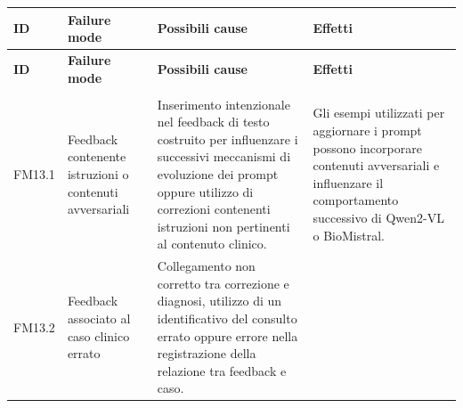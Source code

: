 

{
\small
{}
\setlength{\tabcolsep}{4pt}
\renewcommand{\arraystretch}{1.08}

\begin{xltabular}{\textwidth}{
    >{\raggedright\arraybackslash}p{1.1cm}
    >{\raggedright\arraybackslash}p{3cm}
    >{\raggedright\arraybackslash}p{5cm}
    X
}

\toprule

\textbf{ID} &
\textbf{Failure mode} &
\textbf{Possibili cause} &
\textbf{Effetti} \\

\midrule

\endfirsthead

\toprule

\textbf{ID} &
\textbf{Failure mode} &
\textbf{Possibili cause} &
\textbf{Effetti} \\

\midrule

\endhead

\midrule
{} \\

\endfoot

\endlastfoot


FM13.1 \hypertarget{fm13-1}{} &

Feedback contenente istruzioni o contenuti avversariali &

Inserimento intenzionale nel feedback di testo costruito per
influenzare i successivi meccanismi di evoluzione dei prompt oppure
utilizzo di correzioni contenenti istruzioni non pertinenti al
contenuto clinico. &

Gli esempi utilizzati per aggiornare i prompt possono incorporare
contenuti avversariali e influenzare il comportamento successivo
di Qwen2-VL o BioMistral. \\

\midrule


FM13.2 &

Feedback associato al caso clinico errato &

Collegamento non corretto tra correzione e diagnosi, utilizzo di
un identificativo del consulto errato oppure errore nella
registrazione della relazione tra feedback e caso. &


\end{xltabular}}
